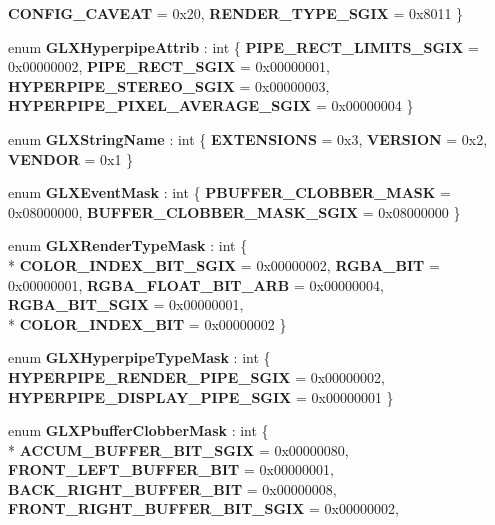 \begin{DoxyCompactItemize}
{\bfseries C\-O\-N\-F\-I\-G\-\_\-\-C\-A\-V\-E\-A\-T} = 0x20, 
{\bfseries R\-E\-N\-D\-E\-R\-\_\-\-T\-Y\-P\-E\-\_\-\-S\-G\-I\-X} = 0x8011
 \}
\item 
enum {\bfseries G\-L\-X\-Hyperpipe\-Attrib} \-: int \{ {\bfseries P\-I\-P\-E\-\_\-\-R\-E\-C\-T\-\_\-\-L\-I\-M\-I\-T\-S\-\_\-\-S\-G\-I\-X} = 0x00000002, 
{\bfseries P\-I\-P\-E\-\_\-\-R\-E\-C\-T\-\_\-\-S\-G\-I\-X} = 0x00000001, 
{\bfseries H\-Y\-P\-E\-R\-P\-I\-P\-E\-\_\-\-S\-T\-E\-R\-E\-O\-\_\-\-S\-G\-I\-X} = 0x00000003, 
{\bfseries H\-Y\-P\-E\-R\-P\-I\-P\-E\-\_\-\-P\-I\-X\-E\-L\-\_\-\-A\-V\-E\-R\-A\-G\-E\-\_\-\-S\-G\-I\-X} = 0x00000004
 \}
\item 
enum {\bfseries G\-L\-X\-String\-Name} \-: int \{ {\bfseries E\-X\-T\-E\-N\-S\-I\-O\-N\-S} = 0x3, 
{\bfseries V\-E\-R\-S\-I\-O\-N} = 0x2, 
{\bfseries V\-E\-N\-D\-O\-R} = 0x1
 \}
\item 
enum {\bfseries G\-L\-X\-Event\-Mask} \-: int \{ {\bfseries P\-B\-U\-F\-F\-E\-R\-\_\-\-C\-L\-O\-B\-B\-E\-R\-\_\-\-M\-A\-S\-K} = 0x08000000, 
{\bfseries B\-U\-F\-F\-E\-R\-\_\-\-C\-L\-O\-B\-B\-E\-R\-\_\-\-M\-A\-S\-K\-\_\-\-S\-G\-I\-X} = 0x08000000
 \}
\item 
enum {\bfseries G\-L\-X\-Render\-Type\-Mask} \-: int \{ \\*
{\bfseries C\-O\-L\-O\-R\-\_\-\-I\-N\-D\-E\-X\-\_\-\-B\-I\-T\-\_\-\-S\-G\-I\-X} = 0x00000002, 
{\bfseries R\-G\-B\-A\-\_\-\-B\-I\-T} = 0x00000001, 
{\bfseries R\-G\-B\-A\-\_\-\-F\-L\-O\-A\-T\-\_\-\-B\-I\-T\-\_\-\-A\-R\-B} = 0x00000004, 
{\bfseries R\-G\-B\-A\-\_\-\-B\-I\-T\-\_\-\-S\-G\-I\-X} = 0x00000001, 
\\*
{\bfseries C\-O\-L\-O\-R\-\_\-\-I\-N\-D\-E\-X\-\_\-\-B\-I\-T} = 0x00000002
 \}
\item 
enum {\bfseries G\-L\-X\-Hyperpipe\-Type\-Mask} \-: int \{ {\bfseries H\-Y\-P\-E\-R\-P\-I\-P\-E\-\_\-\-R\-E\-N\-D\-E\-R\-\_\-\-P\-I\-P\-E\-\_\-\-S\-G\-I\-X} = 0x00000002, 
{\bfseries H\-Y\-P\-E\-R\-P\-I\-P\-E\-\_\-\-D\-I\-S\-P\-L\-A\-Y\-\_\-\-P\-I\-P\-E\-\_\-\-S\-G\-I\-X} = 0x00000001
 \}
\item 
enum {\bfseries G\-L\-X\-Pbuffer\-Clobber\-Mask} \-: int \{ \\*
{\bfseries A\-C\-C\-U\-M\-\_\-\-B\-U\-F\-F\-E\-R\-\_\-\-B\-I\-T\-\_\-\-S\-G\-I\-X} = 0x00000080, 
{\bfseries F\-R\-O\-N\-T\-\_\-\-L\-E\-F\-T\-\_\-\-B\-U\-F\-F\-E\-R\-\_\-\-B\-I\-T} = 0x00000001, 
{\bfseries B\-A\-C\-K\-\_\-\-R\-I\-G\-H\-T\-\_\-\-B\-U\-F\-F\-E\-R\-\_\-\-B\-I\-T} = 0x00000008, 
{\bfseries F\-R\-O\-N\-T\-\_\-\-R\-I\-G\-H\-T\-\_\-\-B\-U\-F\-F\-E\-R\-\_\-\-B\-I\-T\-\_\-\-S\-G\-I\-X} = 0x00000002, 

\end{DoxyCompactItemize}
